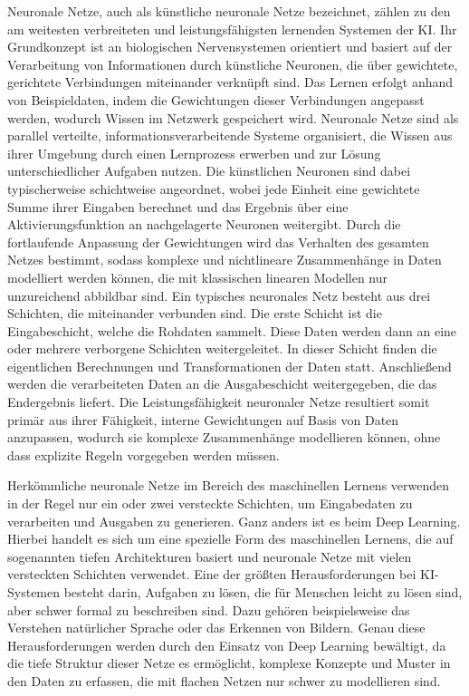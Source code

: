 Neuronale Netze, auch als künstliche neuronale Netze bezeichnet, zählen zu den am weitesten verbreiteten und leistungsfähigsten lernenden Systemen der \ac{KI}. Ihr Grundkonzept ist an biologischen Nervensystemen orientiert und basiert auf der Verarbeitung von Informationen durch künstliche Neuronen, die über gewichtete, gerichtete Verbindungen miteinander verknüpft sind. Das Lernen erfolgt anhand von Beispieldaten, indem die Gewichtungen dieser Verbindungen angepasst werden, wodurch Wissen im Netzwerk gespeichert wird. \cite[\pagef 727ff]{russell_artificial_2016} Neuronale Netze sind als parallel verteilte, informationsverarbeitende Systeme organisiert, die Wissen aus ihrer Umgebung durch einen Lernprozess erwerben und zur Lösung unterschiedlicher Aufgaben nutzen. Die künstlichen Neuronen sind dabei typischerweise schichtweise angeordnet, wobei jede Einheit eine gewichtete Summe ihrer Eingaben berechnet und das Ergebnis über eine Aktivierungsfunktion an nachgelagerte Neuronen weitergibt. Durch die fortlaufende Anpassung der Gewichtungen wird das Verhalten des gesamten Netzes bestimmt, sodass komplexe und nichtlineare Zusammenhänge in Daten modelliert werden können, die mit klassischen linearen Modellen nur unzureichend abbildbar sind. \cite[\pagef 23ff]{haykin_neural_1999} 
Ein typisches neuronales Netz besteht aus drei Schichten, die miteinander verbunden sind. Die erste Schicht ist die Eingabeschicht, welche die Rohdaten sammelt. Diese Daten werden dann an eine oder mehrere verborgene Schichten weitergeleitet. In dieser Schicht finden die eigentlichen Berechnungen und Transformationen der Daten statt. Anschließend werden die verarbeiteten Daten an die Ausgabeschicht weitergegeben, die das Endergebnis liefert. \cite[]{asadollahfardi_artificial_2015}
Die Leistungsfähigkeit neuronaler Netze resultiert somit primär aus ihrer Fähigkeit, interne Gewichtungen auf Basis von Daten anzupassen, wodurch sie komplexe Zusammenhänge modellieren können, ohne dass explizite Regeln vorgegeben werden müssen. 

Herkömmliche neuronale Netze im Bereich des maschinellen Lernens verwenden in der Regel nur ein oder zwei versteckte Schichten, um Eingabedaten zu verarbeiten und Ausgaben zu generieren. Ganz anders ist es beim Deep Learning. Hierbei handelt es sich um eine spezielle Form des maschinellen Lernens, die auf sogenannten tiefen Architekturen basiert und neuronale Netze mit vielen versteckten Schichten verwendet.
 \cite[]{ruhlig_deep_2014}
Eine der größten Herausforderungen bei \ac{KI}-Systemen besteht darin, Aufgaben zu lösen, die für Menschen leicht zu lösen sind, aber schwer formal zu beschreiben sind. Dazu gehören beispielsweise das Verstehen natürlicher Sprache oder das Erkennen von Bildern. Genau diese Herausforderungen werden durch den Einsatz von Deep Learning bewältigt, da die tiefe Struktur dieser Netze es ermöglicht, komplexe Konzepte und Muster in den Daten zu erfassen, die mit flachen Netzen nur schwer zu modellieren sind. \cite[\pagef 1ff]{goodfellow_deep_2016}

